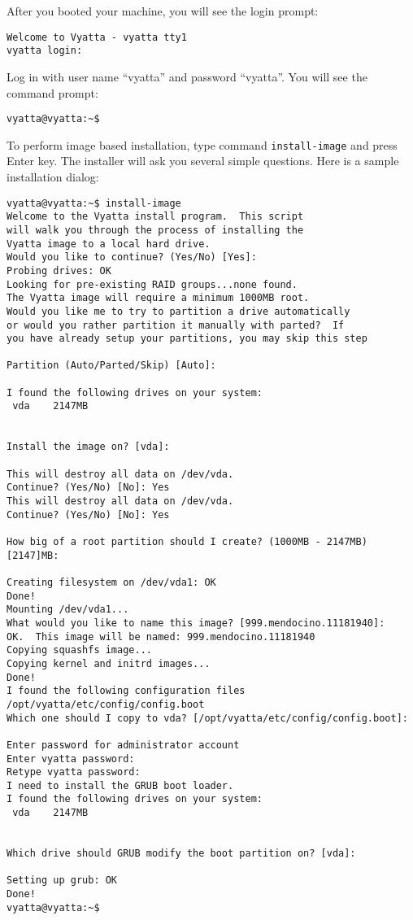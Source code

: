 After you booted your machine, you will see the login prompt:
\begin{verbatim}
Welcome to Vyatta - vyatta tty1
vyatta login: 
\end{verbatim}

Log in with user name ``vyatta'' and password ``vyatta''. You will see the command prompt:
\begin{verbatim}
vyatta@vyatta:~$
\end{verbatim}

To perform image based installation, type command \texttt{install-image} and press Enter key. The installer will ask
you several simple questions. Here is a sample installation dialog:
\begin{verbatim}
vyatta@vyatta:~$ install-image 
Welcome to the Vyatta install program.  This script
will walk you through the process of installing the
Vyatta image to a local hard drive.
Would you like to continue? (Yes/No) [Yes]: 
Probing drives: OK
Looking for pre-existing RAID groups...none found.
The Vyatta image will require a minimum 1000MB root.
Would you like me to try to partition a drive automatically
or would you rather partition it manually with parted?  If
you have already setup your partitions, you may skip this step

Partition (Auto/Parted/Skip) [Auto]: 

I found the following drives on your system:
 vda	2147MB


Install the image on? [vda]:

This will destroy all data on /dev/vda.
Continue? (Yes/No) [No]: Yes
This will destroy all data on /dev/vda.
Continue? (Yes/No) [No]: Yes

How big of a root partition should I create? (1000MB - 2147MB) [2147]MB: 

Creating filesystem on /dev/vda1: OK
Done!
Mounting /dev/vda1...
What would you like to name this image? [999.mendocino.11181940]: 
OK.  This image will be named: 999.mendocino.11181940
Copying squashfs image...
Copying kernel and initrd images...
Done!
I found the following configuration files
/opt/vyatta/etc/config/config.boot
Which one should I copy to vda? [/opt/vyatta/etc/config/config.boot]: 

Enter password for administrator account
Enter vyatta password:
Retype vyatta password:
I need to install the GRUB boot loader.
I found the following drives on your system:
 vda	2147MB


Which drive should GRUB modify the boot partition on? [vda]:

Setting up grub: OK
Done!
vyatta@vyatta:~$ 

\end{verbatim}


